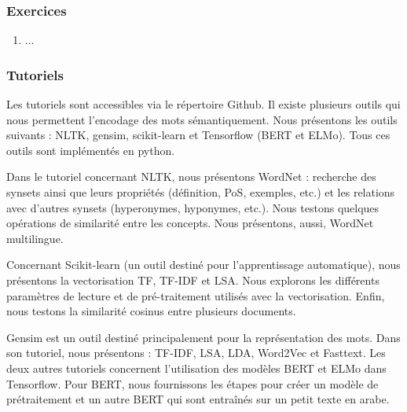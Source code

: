 \documentclass{KodeBook}
\begin{document}


\subsubsection*{Exercices}

\begin{enumerate}
	\item ...
	
\end{enumerate}

\subsubsection*{Tutoriels}

Les tutoriels sont accessibles via le répertoire Github.
Il existe plusieurs outils qui nous permettent l'encodage des mots sémantiquement. 
Nous présentons les outils suivants : NLTK, gensim, scikit-learn et Tensorflow (BERT et ELMo).
Tous ces outils sont implémentés en python.

Dans le tutoriel concernant NLTK, nous présentons WordNet : recherche des synsets ainsi que leurs propriétés (définition, PoS, exemples, etc.) et les relations avec d'autres synsets (hyperonymes, hyponymes, etc.).
Nous testons quelques opérations de similarité entre les concepts.
Nous présentons, aussi, WordNet multilingue.

Concernant Scikit-learn (un outil destiné pour l'apprentissage automatique), nous présentons la vectorisation TF, TF-IDF et LSA.
Nous explorons les différents paramètres de lecture et de pré-traitement utilisés avec la vectorisation.
Enfin, nous testons la similarité cosinus entre plusieurs documents.

Gensim est un outil destiné principalement pour la représentation des mots.
Dans son tutoriel, nous présentons : TF-IDF, LSA, LDA, Word2Vec et Fasttext.
Les deux autres tutoriels concernent l'utilisation des modèles BERT et ELMo dans Tensorflow.
Pour BERT, nous fournissons les étapes pour créer un modèle de prétraitement et un autre BERT qui sont entraînés sur un petit texte en arabe.


%
%
\end{document}
